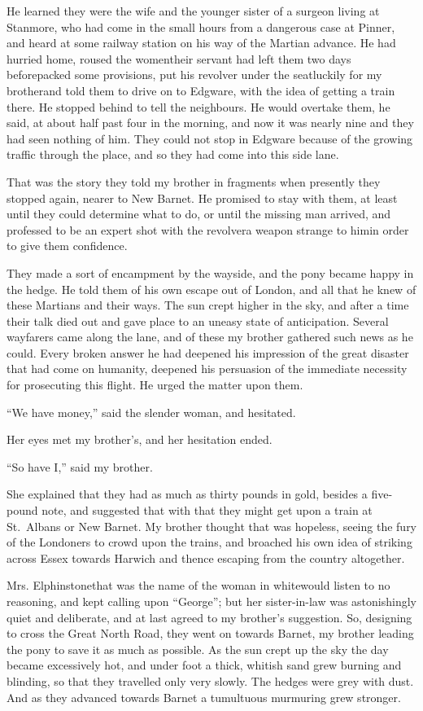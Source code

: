 He learned they were the wife and the younger sister of a surgeon
living at Stanmore, who had come in the small hours from a
dangerous case at Pinner, and heard at some railway station on his
way of the Martian advance. He had hurried home, roused the
women\dash{}their servant had left them two days before\dash{}packed some
provisions, put his revolver under the seat\dash{}luckily for my
brother\dash{}and told them to drive on to Edgware, with the idea of
getting a train there. He stopped behind to tell the neighbours. He
would overtake them, he said, at about half past four in the
morning, and now it was nearly nine and they had seen nothing of
him. They could not stop in Edgware because of the growing traffic
through the place, and so they had come into this side lane.

That was the story they told my brother in fragments when presently
they stopped again, nearer to New Barnet. He promised to stay with
them, at least until they could determine what to do, or until the
missing man arrived, and professed to be an expert shot with the
revolver\dash{}a weapon strange to him\dash{}in order to give them
confidence.

They made a sort of encampment by the wayside, and the pony became
happy in the hedge. He told them of his own escape out of London,
and all that he knew of these Martians and their ways. The sun
crept higher in the sky, and after a time their talk died out and
gave place to an uneasy state of anticipation. Several wayfarers
came along the lane, and of these my brother gathered such news as
he could. Every broken answer he had deepened his impression of the
great disaster that had come on humanity, deepened his persuasion
of the immediate necessity for prosecuting this flight. He urged
the matter upon them.

``We have money,'' said the slender woman, and hesitated.

Her eyes met my brother's, and her hesitation ended.

``So have I,'' said my brother.

She explained that they had as much as thirty pounds in gold,
besides a five-pound note, and suggested that with that they might
get upon a train at St.\ Albans or New Barnet. My brother thought
that was hopeless, seeing the fury of the Londoners to crowd upon
the trains, and broached his own idea of striking across Essex
towards Harwich and thence escaping from the country altogether.

Mrs. Elphinstone\dash{}that was the name of the woman in white\dash{}would
listen to no reasoning, and kept calling upon ``George''; but her
sister-in-law was astonishingly quiet and deliberate, and at last
agreed to my brother's suggestion. So, designing to cross the Great
North Road, they went on towards Barnet, my brother leading the
pony to save it as much as possible. As the sun crept up the sky
the day became excessively hot, and under foot a thick, whitish
sand grew burning and blinding, so that they travelled only very
slowly. The hedges were grey with dust. And as they advanced
towards Barnet a tumultuous murmuring grew stronger.

